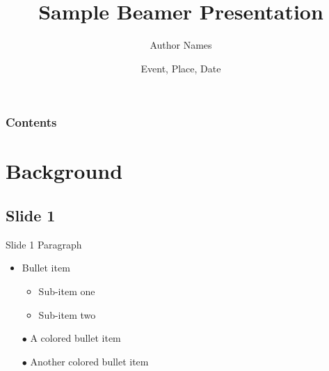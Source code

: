 \documentclass[compress,ignorenonframetext]{beamer}
\title{Sample Beamer Presentation}
\author{Author Names}
\institute{Company or Institute}
\date{Event, Place, Date}
\begin{document}

\begin{frame}[plain]
\titlepage %
\addtocounter{framenumber}{-1}
\end{frame}

\begin{frame}
\frametitle{Contents}%
\tableofcontents%
\end{frame}

\section{Background}

\subsection{Slide 1}
\begin{frame}{Slide 1}
Paragraph
\begin{itemize}
\item Bullet item
	\begin{itemize}
	\item Sub-item one
	\item Sub-item two
	\end{itemize}
\item[\color{green} $\bullet$] A colored bullet item
\item[\color{red} $\bullet$] Another colored bullet item
\end{itemize}

\end{frame}
\end{document}
